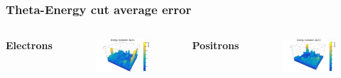 \documentclass{beamer}
\begin{document}
		\begin{frame}
			\frametitle{Theta-Energy cut average error}
			\begin{columns}
				\centering
				\Large \textbf{Electrons}
				\begin{figure}
					\centering
					\includegraphics[width = 0.95 \linewidth]{images/c_e_theta_energy_abs.png}
				\end{figure}
				\centering
				\Large \textbf{Positrons}
				\begin{figure}
					\centering
					\includegraphics[width = 0.95 \linewidth]{images/c_p_theta_energy_abs.png}
				\end{figure}
			\end{columns}
		\end{frame}
\end{document}
